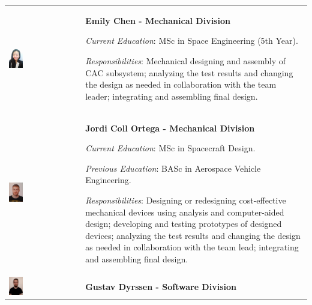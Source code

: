\begin{longtable}[]{m{} m{}}
\includegraphics[width=0.2\textwidth]{1-introduction/img/emily-chen.jpeg} & \textbf{Emily Chen - Mechanical Division}

\smallskip
\textit{Current Education}: MSc in Space Engineering (5th Year).


\smallskip
\textit{Responsibilities}: Mechanical designing and assembly of CAC subsystem; analyzing the test results and changing the design as needed in collaboration with the team leader; integrating and assembling final design. 
\bigskip
\\

\includegraphics[width=0.2\textwidth]{1-introduction/img/jordi-coll-ortega.jpg} & \textbf{Jordi Coll Ortega - Mechanical Division}

\smallskip
\textit{Current Education}: MSc in Spacecraft Design.

\smallskip
\textit{Previous Education}: BASc in Aerospace Vehicle Engineering.

\smallskip
\textit{Responsibilities}: Designing or redesigning cost-effective mechanical devices using analysis and computer-aided design; developing and testing prototypes of designed devices; analyzing the test results and changing the design as needed in collaboration with the team lead; integrating and assembling final design.
\bigskip
\\

\includegraphics[width=0.2\textwidth]{1-introduction/img/gustav-dryssen.jpg} & \textbf{Gustav Dyrssen - Software Division}


\end{longtable}
